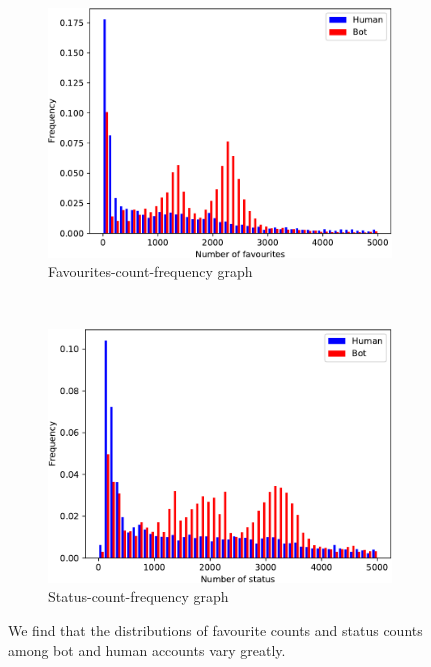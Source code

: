 \begin{figure}[t]
    \centering
    \begin{subfigure}[t]{0.5\textwidth}
        \includegraphics[width=\textwidth]{FIG/favourites_count-crop.pdf}
        \caption{Favourites-count-frequency graph}
    \end{subfigure}%
    ~
    \begin{subfigure}[t]{0.5\textwidth}
        \includegraphics[width=\textwidth]{FIG/status_count-crop.pdf}
        \caption{Status-count-frequency graph}
    \end{subfigure}%
    \caption{We find that the distributions of favourite counts and status counts among bot and human accounts vary greatly.}
    \label{fig:fav_status_counts}
\end{figure}

